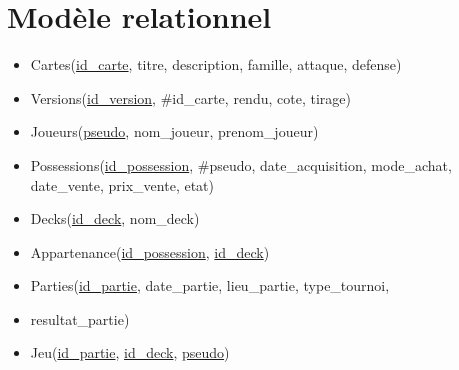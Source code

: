 \documentclass{article}
\begin{document}
\section{Modèle relationnel}

\begin{itemize}


    \item[] Cartes(\underline{id\_carte}, titre, description, famille, attaque, defense) \\
    \item[] Versions(\underline{id\_version}, \#id\_carte, rendu, cote, tirage) \\
    \item[] Joueurs(\underline{pseudo}, nom\_joueur, prenom\_joueur) \\
    \item[] Possessions(\underline{id\_possession}, \#pseudo, date\_acquisition, mode\_achat, date\_vente, prix\_vente, etat) \\
    \item[] Decks(\underline{id\_deck}, nom\_deck) \\
    \item[] Appartenance(\underline{id\_possession}, \underline{id\_deck}) \\
    \item[] Parties(\underline{id\_partie}, date\_partie, lieu\_partie, type\_tournoi,
    \item[] resultat\_partie) \\
    \item[] Jeu(\underline{id\_partie}, \underline{id\_deck}, \underline{pseudo}) \\

\end{itemize}
\end{document}
